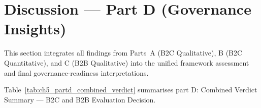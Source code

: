 \section{Discussion --- Part D (Governance Insights)}
\label{sec:ch5_part_d}

This section integrates all findings from Parts~A (B2C Qualitative), B (B2C Quantitative), and C (B2B Qualitative) into the unified framework assessment and final governance-readiness interpretations.

\noindent Table~\ref{tab:ch5_partd_combined_verdict} summarises part D: Combined Verdict Summary --- B2C and B2B Evaluation Decision.

